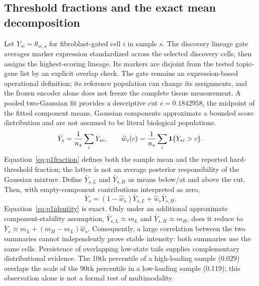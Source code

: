 \subsection{Threshold fractions and the exact mean decomposition}
Let $Y_{si}=\theta_{si,\star}$ for fibroblast-gated cell $i$ in sample $s$. The discovery lineage gate averages marker expression standardized across the selected discovery cells, then assigns the highest-scoring lineage. Its markers are disjoint from the tested topic-gene list by an explicit overlap check. The gate remains an expression-based operational definition; its reference population can change its assignments, and the frozen encoder alone does not freeze the complete tissue measurement. A pooled two-Gaussian fit provides a descriptive cut $c=0.1842958$, the midpoint of the fitted component means. Gaussian components approximate a bounded score distribution and are not assumed to be literal biological populations.
\begin{equation}
\bar Y_s=\frac1{n_s}\sum_iY_{si},\qquad
\widehat w_s(c)=\frac1{n_s}\sum_i\mathbf{1}\{Y_{si}>c\}.\label{eq:p1fraction}
\end{equation}
Equation~\eqref{eq:p1fraction} defines both the sample mean and the reported hard-threshold fraction; the latter is not an average posterior responsibility of the Gaussian mixture. Define $\bar Y_{s,L}$ and $\bar Y_{s,H}$ as means below/at and above the cut. Then, with empty-component contributions interpreted as zero,
\begin{equation}
\bar Y_s=(1-\widehat w_s)\bar Y_{s,L}+\widehat w_s\bar Y_{s,H}.\label{eq:p1identity}
\end{equation}
Equation~\eqref{eq:p1identity} is exact. Only under an additional approximate component-stability assumption, $\bar Y_{s,L}\approx m_L$ and $\bar Y_{s,H}\approx m_H$, does it reduce to $\bar Y_s\approx m_L+(m_H-m_L)\widehat w_s$. Consequently, a large correlation between the two summaries cannot independently prove stable intensity: both summaries use the same cells. Persistence of overlapping low-state tails supplies complementary distributional evidence. The 10th percentile of a high-loading sample (0.029) overlaps the scale of the 90th percentile in a low-loading sample (0.119); this observation alone is not a formal test of multimodality.

